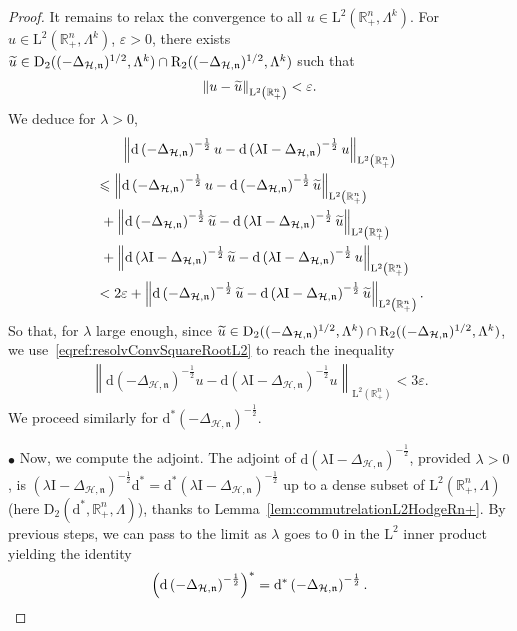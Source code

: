\documentclass[10pt]{amsart}
\theoremstyle{definition}\newtheorem{defi}[theo]{Definition}\newtheorem{rema}[theo]{Remark}\newtheorem{exam}[theo]{Example}\newtheorem{exem}[theo]{Example}\newtheorem{nota}[theo]{Notation}
\newcommand{\bbR}{\mathbb{R}}
\newcommand{\rmd}{\mathrm{d}}
\newcommand{\rmD}{\mathrm{D}}
\newcommand{\rmL}{\mathrm{L}}
\newcommand{\rmR}{\mathrm{R}}
\newcommand{\rmI}{\mathrm{I}}
\newcommand{\clH}{\mathcal{H}}
\newcommand{\fkn}{\mathfrak{n}}
\let\oldtilde\tilde
\renewcommand*{\tilde}[1]{\mathchoice{\widetilde{#1}}{\widetilde{#1}}{\oldtilde{#1}}{\oldtilde{#1}}}
\begin{document}
\begin{proof}
It remains to relax the convergence to all $u\in\rmL^2(\bbR^n_+,\Lambda^k)$. For $u\in\rmL^2(\bbR^n_+,\Lambda^k)$, $\varepsilon>0$, there exists $\tilde{u}\in\rmD_2((-\Delta_{\clH,\fkn})^{1/2},\Lambda^k)\cap\rmR_2((-\Delta_{\clH,\fkn})^{1/2},\Lambda^k) $ such that
\begin{align*}
\| u-\Tilde{u} \|_{\rmL^2\left(\bbR^n_+\right)}<\varepsilon.
\end{align*}
We deduce for $\lambda >0$,
\begin{multline*}
\left\| \rmd\left(-\Delta_{\clH,\fkn}\right)^{-\frac{1}{2}} u - \rmd\left(\lambda\rmI -\Delta_{\clH,\fkn}\right)^{-\frac{1}{2}} u\right\|_{\rmL^2\left(\bbR^n_+\right)}\\
\begin{aligned}
&\leqslant \left\| \rmd\left(-\Delta_{\clH,\fkn}\right)^{-\frac{1}{2}} u - \rmd\left(-\Delta_{\clH,\fkn}\right)^{-\frac{1}{2}} \tilde{u}\right\|_{\rmL^2\left(\bbR^n_+\right)}\\
&\,\,+\left\| \rmd\left(-\Delta_{\clH,\fkn}\right)^{-\frac{1}{2}} \tilde{u} - \rmd\left(\lambda\rmI -\Delta_{\clH,\fkn}\right)^{-\frac{1}{2}} \tilde{u}\right\|_{\rmL^2\left(\bbR^n_+\right)}\\
&\,\,+\left\| \rmd\left(\lambda\rmI -\Delta_{\clH,\fkn}\right)^{-\frac{1}{2}} \tilde{u} - \rmd\left(\lambda\rmI -\Delta_{\clH,\fkn}\right)^{-\frac{1}{2}} u\right\|_{\rmL^2\left(\bbR^n_+\right)}\\
&<2\varepsilon + \left\| \rmd\left(-\Delta_{\clH,\fkn}\right)^{-\frac{1}{2}} \tilde{u} - \rmd\left(\lambda\rmI -\Delta_{\clH,\fkn}\right)^{-\frac{1}{2}} \tilde{u}\right\|_{\rmL^2\left(\bbR^n_+\right)}.
\end{aligned}
\end{multline*}
So that, for $\lambda$ large enough, since $\tilde{u}\in\rmD_2((-\Delta_{\clH,\fkn})^{1/2},\Lambda^k)\cap\rmR_2((-\Delta_{\clH,\fkn})^{1/2},\Lambda^k)$, we use~\eqref{eqref:resolvConvSquareRootL2} to reach the inequality
\begin{align*}
\left\| \rmd\left(-\Delta_{\clH,\fkn}\right)^{-\frac{1}{2}} u - \rmd\left(\lambda\rmI -\Delta_{\clH,\fkn}\right)^{-\frac{1}{2}} u\right\|_{\rmL^2\left(\bbR^n_+\right)}<3\varepsilon.
\end{align*}
We proceed similarly for $ \rmd^\ast(-\Delta_{\clH,\fkn})^{-\frac{1}{2}}$.


$\bullet$ Now, we compute the adjoint. The adjoint of $\rmd(\lambda\rmI -\Delta_{\clH,\fkn})^{-\frac{1}{2}}$, provided $\lambda>0$, is $(\lambda\rmI -\Delta_{\clH,\fkn})^{-\frac{1}{2}}\rmd^\ast=\rmd^\ast(\lambda\rmI -\Delta_{\clH,\fkn})^{-\frac{1}{2}}$ up to a dense subset of $\rmL^2(\bbR^n_+,\Lambda)$ (here $\rmD_2(\rmd^\ast,\bbR^n_+,\Lambda)$), thanks to Lemma~\ref{lem:commutrelationL2HodgeRn+}. By previous steps, we can pass to the limit as $\lambda$ goes to $0$ in the $\rmL^2$ inner product yielding the identity
\[
\left(\rmd\left(-\Delta_{\clH,\fkn}\right)^{-\frac{1}{2}}\right)^\ast = \rmd^\ast\left(-\Delta_{\clH,\fkn}\right)^{-\frac{1}{2}} .\qedhere
\]
\end{proof}
\end{document}
